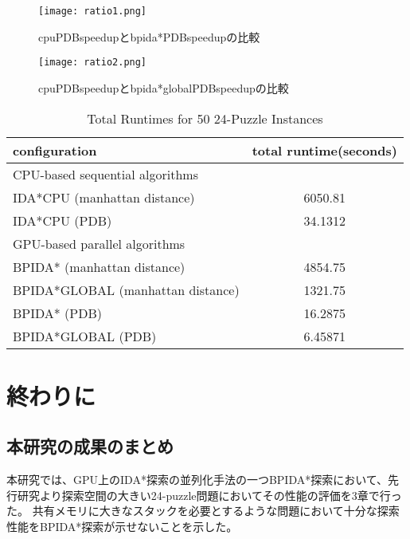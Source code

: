 \documentclass[a4paper,11pt,oneside,openany]{jsbook}
\begin{document}
\begin{figure}[H]
\begin{minipage}{0.5\hsize}
\begin{center}
\texttt{[image: ratio1.png]}
\caption{cpuPDBspeedupとbpida*PDBspeedupの比較}
\end{center}
\end{minipage}
\begin{minipage}{0.5\hsize}
\begin{center}
\texttt{[image: ratio2.png]}
\caption{cpuPDBspeedupとbpida*globalPDBspeedupの比較}
\end{center}
\end{minipage}
\end{figure}


\begin{table}[H]
\centering
\caption{Total Runtimes for 50 24-Puzzle Instances}
\label{my-label}
\begin{tabular}{|l|c|}
\hline
configuration & \multicolumn{1}{l|}{total runtime(seconds)} \\ \hline
\multicolumn{2}{|l|}{CPU-based sequential algorithms} \\ \hline
IDA*CPU (manhattan distance) & 6050.81 \\ 
IDA*CPU (PDB) & 34.1312 \\ \hline
\multicolumn{2}{|l|}{GPU-based parallel algorithms} \\ \hline
BPIDA* (manhattan distance)& 4854.75 \\
BPIDA*GLOBAL (manhattan distance) & 1321.75 \\
BPIDA* (PDB)& 16.2875 \\
BPIDA*GLOBAL (PDB) & 6.45871 \\ \hline
\end{tabular}
\end{table}



\chapter{終わりに}
\section{本研究の成果のまとめ}
本研究では、GPU上のIDA*探索の並列化手法の一つBPIDA*探索において、先行研究\cite{HA17}より探索空間の大きい24-puzzle問題においてその性能の評価を3章で行った。
共有メモリに大きなスタックを必要とするような問題において十分な探索性能をBPIDA*探索が示せないことを示した。
\end{document}
